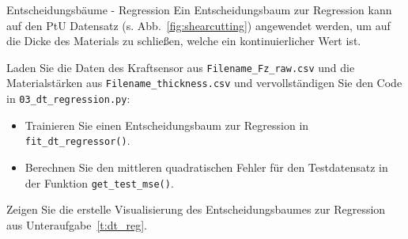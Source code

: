 \begin{task}[credit=3]{Entscheidungsbäume - Regression}
Ein Entscheidungsbaum zur Regression kann auf den PtU Datensatz (s. Abb.~\ref{fig:shearcutting}) angewendet werden, um auf die Dicke des Materials zu schließen, welche ein kontinuierlicher Wert ist. 

 \begin{subtask}[points=2,title=\codesym~\texttt{03\_dt\_regression.py}]
 \label{t:dt_reg}
 Laden Sie die Daten des Kraftsensor aus \texttt{Filename\_Fz\_raw.csv} und die Materialstärken aus \texttt{Filename\_thickness.csv} und vervollständigen Sie den Code in \texttt{03\_dt\_regression.py}:
 
\begin{itemize}
    \item[\codesym] Trainieren Sie einen Entscheidungsbaum zur Regression in \texttt{fit\_dt\_regressor()}.
    \item[\codesym] Berechnen Sie den mittleren quadratischen Fehler für den Testdatensatz in der Funktion \texttt{get\_test\_mse()}.
\end{itemize}
\end{subtask}

 \begin{subtask}[points=1,title=Visualisierung]
Zeigen Sie die erstelle Visualisierung des Entscheidungsbaumes zur Regression aus Unteraufgabe~\ref{t:dt_reg}.

\begin{solution}
\end{solution}

\end{subtask}
\end{task}
